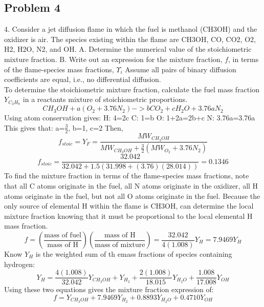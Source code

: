 \documentclass[preview,12pt]{article}
\begin{document}
\begin{center}
    \section*{Problem 4}
\end{center}
4. Consider a jet diffusion flame in which the fuel is methanol (CH3OH) and the oxidizer is air. The species existing within the flame are CH3OH, CO, CO2, O2, H2, H2O, N2, and OH. \newline
\indent A. Determine the numerical value of the stoichiometric mixture fraction.\newline
\indent B. Write out an expression for the mixture fraction, $f$, in terms of the flame-species mass fractions, $Υ_i$ Assume all pairs of binary diffusion coefficients are equal, i.e., no differential diffusion.
$$$$
To determine the stoichiometric mixture fraction, calculate the fuel mass fraction $Y_{C_3H_8}$ in a reactants mixture of stoichiometric proportions. 
$$CH_3OH+a(O_2+3.76N_2)->bCO_2+cH_2O+3.76aN_2$$
Using atom conservation gives:\newline
\indent H: 4=2c \newline
\indent C: 1=b \newline
\indent O: 1+2a=2b+c \newline
\indent N: 3.76a=3.76a \newline
This gives that: \newline
\indent a=$\frac{3}{2}$, b=1, c=2\newline
Then, \newline
$$f_{stoic}=Y_F=\frac{MW_{CH_3OH}}{MW_{CH_3OH}+\frac{3}{2}(MW_{O_2}+3.76N_2)}$$
$$f_{stoic}=\frac{32.042}{32.042+1.5(31.998+(3.76)(28.014))}=0.1346$$
To find the mixture fraction in terms of the flame-species mass fractions,  note that all C atoms originate in the fuel, all N atoms originate in the oxidizer, all H atoms originate in the fuel, but not all O atoms originate in the fuel.  Because the only source of elemental H within the flame is CH3OH, can determine the local mixture fraction knowing that it must be proportional to the local elemental H mass fraction.
$$f=\left(\frac{\textrm{mass of fuel}}{\textrm{mass of H}}\right)\left(\frac{\textrm{mass of H}}{\textrm{mass of mixture}}\right)=\frac{32.042}{4(1.008)}Y_H=7.9469Y_H$$
Know $Y_H$ is the weighted sum of th emass fractions of species containing hydrogen:
$$Y_H=\frac{4(1.008)}{32.042}Y_{CH_3OH}+Y_{H_2}+\frac{2(1.008)}{18.015}Y_{H_2O}+\frac{1.008}{17.008}Y_{OH}$$
Using these two equations gives the mixture fraction expression of:
$$f=Y_{CH_3OH}+7.9469Y_{H_2}+0.8893Y_{H_2O}+0.4710Y_{OH}$$
$$$$
\end{document}
